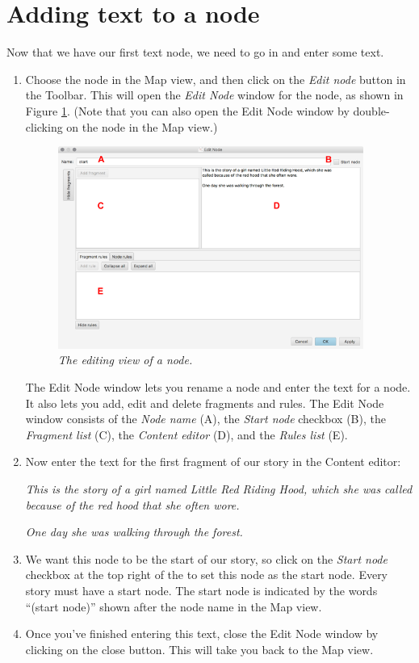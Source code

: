 \documentclass{article}
\begin{document}
\section{Adding text to a node}

Now that we have our first text node, we need to go in and enter some text.

\begin{enumerate}
  \item Choose the node in the Map view, and then click on the \textit{Edit node} button in the Toolbar. This will open the \textit{Edit Node} window for the node, as shown in Figure \ref{fig:tut1:edit_node}. (Note that you can also open the Edit Node window by double-clicking on the node in the Map view.)
  
\begin{figure}[ht]
  \centering
  \includegraphics[width=10cm]{images/hypedyn-tutorial-1-figure-5}
  \caption{\textit{The editing view of a node.}}
  \label{fig:tut1:edit_node}
\end{figure} 

The Edit Node window lets you rename a node and enter the text for a node. It also lets you add, edit and delete fragments and rules. The Edit Node window consists of the \textit{Node name} (A), the \textit{Start node} checkbox (B), the \textit{Fragment list} (C), the \textit{Content editor} (D), and the \textit{Rules list} (E).

\item Now enter the text for the first fragment of our story in the Content editor:

\textit{This is the story of a girl named Little Red Riding Hood, which she was called because of the red hood that she often wore.}

\textit{One day she was walking through the forest.}

\item We want this node to be the start of our story, so click on the \textit{Start node} checkbox at the top right of the  to set this node as the start node. Every story must have a start node. The start node is indicated by the words ``(start node)'' shown after the node name in the Map view. %
\item Once you've finished entering this text, close the Edit Node window by clicking on the close button. This will take you back to the Map view.
\end{enumerate}
\end{document}
